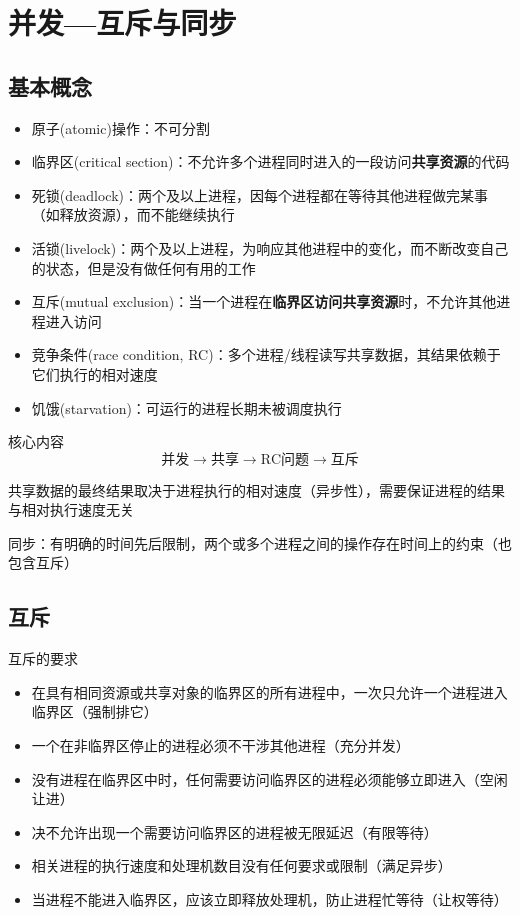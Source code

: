 
\section{并发---互斥与同步}
\subsection{基本概念}
\begin{itemize}
    \item 原子(atomic)操作：不可分割
    \item 临界区(critical section)：不允许多个进程同时进入的一段访问\textbf{共享资源}的代码
    \item 死锁(deadlock)：两个及以上进程，因每个进程都在等待其他进程做完某事（如释放资源），而不能继续执行
    \item 活锁(livelock)：两个及以上进程，为响应其他进程中的变化，而不断改变自己的状态，但是没有做任何有用的工作
    \item 互斥(mutual exclusion)：当一个进程在\textbf{临界区访问共享资源}时，不允许其他进程进入访问
    \item 竞争条件(race condition, RC)：多个进程/线程读写共享数据，其结果依赖于它们执行的相对速度
    \item 饥饿(starvation)：可运行的进程长期未被调度执行
\end{itemize}

核心内容
\[\text{并发}\to\text{共享}\to\text{RC问题}\to\text{互斥}\]

共享数据的最终结果取决于进程执行的相对速度（异步性），需要保证进程的结果与相对执行速度无关

同步：有明确的时间先后限制，两个或多个进程之间的操作存在时间上的约束（也包含互斥）

\subsection{互斥}
互斥的要求
\begin{itemize}
    \item 在具有相同资源或共享对象的临界区的所有进程中，一次只允许一个进程进入临界区（强制排它）
    \item 一个在非临界区停止的进程必须不干涉其他进程（充分并发）
    \item 没有进程在临界区中时，任何需要访问临界区的进程必须能够立即进入（空闲让进）
    \item 决不允许出现一个需要访问临界区的进程被无限延迟（有限等待）
    \item 相关进程的执行速度和处理机数目没有任何要求或限制（满足异步）
    \item 当进程不能进入临界区，应该立即释放处理机，防止进程忙等待（让权等待）
\end{itemize}

